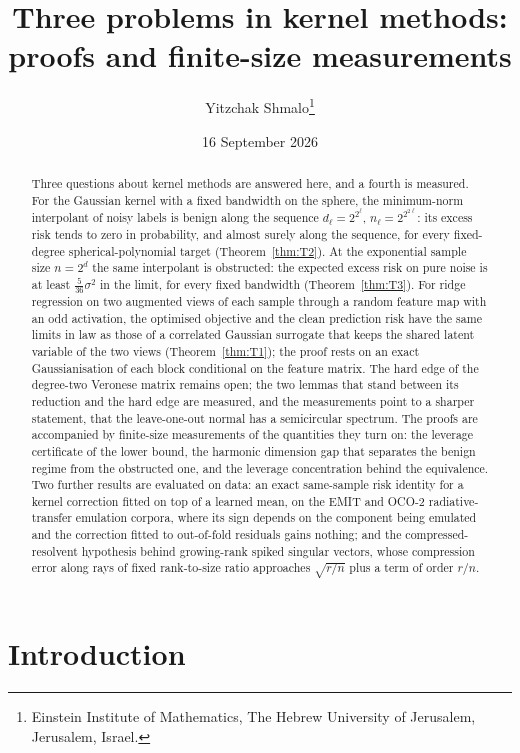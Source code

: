 \documentclass[11pt]{article}
\title{Three problems in kernel methods: proofs and finite-size measurements}
\author{Yitzchak Shmalo\thanks{\raggedright Einstein Institute of Mathematics, The Hebrew University
of Jerusalem, Jerusalem, Israel.}}
\date{16 September 2026}
\theoremstyle{definition}
\begin{document}
\maketitle

\begin{abstract}
Three questions about kernel methods are answered here, and a fourth is measured. For the Gaussian
kernel with a fixed bandwidth on the sphere, the minimum-norm interpolant of noisy labels is benign
along the sequence $d_\ell=2^{2^\ell}$, $n_\ell=2^{2^{2\ell}}$: its excess risk tends to zero in
probability, and almost surely along the sequence, for every fixed-degree spherical-polynomial target
(Theorem~\ref{thm:T2}). At the exponential sample size $n=2^d$ the same interpolant is obstructed: the
expected excess risk on pure noise is at least $\frac5{36}\sigma^2$ in the limit, for every fixed
bandwidth (Theorem~\ref{thm:T3}). For ridge regression on two augmented views of each sample through a
random feature map with an odd activation, the optimised objective and the clean prediction risk have
the same limits in law as those of a correlated Gaussian surrogate that keeps the shared latent
variable of the two views (Theorem~\ref{thm:T1}); the proof rests on an exact Gaussianisation of each
block conditional on the feature matrix. The hard edge of the degree-two Veronese matrix remains
open; the two lemmas that stand between its reduction and the hard edge are measured, and the
measurements point to a sharper statement, that the leave-one-out normal has a semicircular
spectrum. The proofs are accompanied by finite-size measurements of the quantities they turn on: the
leverage certificate of the lower bound, the harmonic dimension gap that separates the benign regime
from the obstructed one, and the leverage concentration behind the equivalence. Two further results
are evaluated on data: an exact same-sample risk identity for a kernel correction fitted on top of a
learned mean, on the EMIT and OCO-2 radiative-transfer emulation corpora, where its sign depends on the
component being emulated and the correction fitted to out-of-fold residuals gains nothing; and the
compressed-resolvent hypothesis behind growing-rank spiked singular vectors, whose compression error
along rays of fixed rank-to-size ratio approaches $\sqrt{r/n}$ plus a term of order $r/n$.
\end{abstract}

\section{Introduction}
\end{document}

